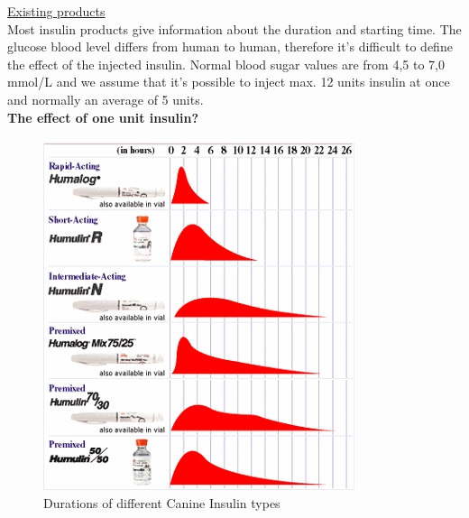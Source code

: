 \underline{Existing products}\\
Most insulin products give information about the duration and starting time. The glucose blood level differs from 
human to human, therefore it's difficult to define the effect of the injected insulin. 
Normal blood sugar values are from 4,5 to 7,0 mmol/L and we assume that it's possible to inject max. 12 units insulin 
at once and normally an average of 5 units.\\
\textbf{The effect of one unit insulin?}
\begin{figure}[htb]
\centering
\includegraphics[scale=1]{images/time_activity.jpg}
\caption{Durations of different Canine Insulin types}
\end{figure}
